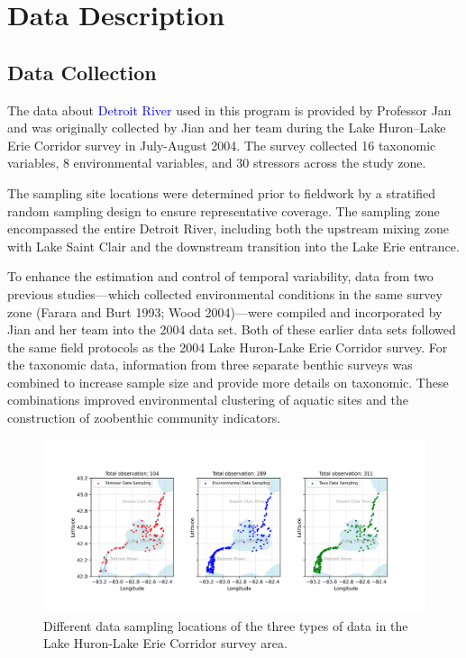 \section{Data Description}

\subsection{Data Collection}

The data about \textcolor{blue}{Detroit River} used in this program is provided by Professor Jan and
 was originally collected by Jian and her team during the Lake Huron–Lake Erie Corridor survey in July-August 2004.
  The survey collected 16 taxonomic variables, 8 environmental 
  variables, and 30 stressors across the study zone.


The sampling site locations were determined prior to 
fieldwork by a stratified random sampling design to ensure representative coverage. 
The sampling zone encompassed the entire Detroit River, including both the upstream mixing zone 
with Lake Saint Clair and the downstream transition into the Lake Erie entrance.

To enhance the estimation and control of temporal variability, 
data from two previous studies—which collected environmental conditions in the same survey zone 
(Farara and Burt 1993; Wood 2004)—were compiled and incorporated by Jian and her team into the 2004 data set. 
Both of these earlier data sets followed the same field protocols as the 2004 Lake Huron-Lake Erie Corridor survey.
For the taxonomic data, information from three separate benthic surveys was combined to
increase sample size and provide more details on taxonomic. 
These combinations improved environmental clustering of aquatic sites and the construction of zoobenthic community indicators. 


\begin{figure}[!h]
    \centering
    \includegraphics[width=1\textwidth]{../results/different_data_sampling_locations.png}
    \caption{Different data sampling locations of the three types of data in the Lake Huron-Lake Erie Corridor survey area.}
    \label{fig:different_data_sampling_locations}
\end{figure}

